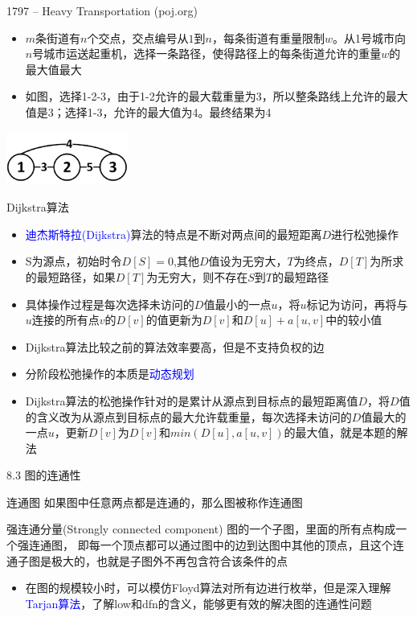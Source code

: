 \begin{frame}{1797 -- Heavy Transportation (poj.org)}
    \begin{itemize}
        \item $m$条街道有$n$个交点，交点编号从$1$到$n$，每条街道有重量限制$w$。从1号城市向$n$号城市运送起重机，选择一条路径，使得路径上的每条街道允许的重量$w$的最大值最大
        \item 如图，选择1-2-3，由于1-2允许的最大载重量为3，所以整条路线上允许的最大值是3；选择1-3，允许的最大值为4。最终结果为4
    \end{itemize}
    \includegraphics[width=0.3\textwidth,center]{fig/8-5.png}
\end{frame}
\begin{frame}{Dijkstra算法}
    \begin{itemize}
        \item \textcolor{blue}{迪杰斯特拉(Dijkstra)}算法的特点是不断对两点间的最短距离$D$进行松弛操作
        \item S为源点，初始时令$D[S]=0$,其他$D$值设为无穷大，$T$为终点，$D[T]$为所求的最短路径，如果$D[T]$为无穷大，则不存在$S$到$T$的最短路径
        \item 具体操作过程是每次选择未访问的$D$值最小的一点$u$，将$u$标记为访问，再将与$u$连接的所有点$v$的$D[v]$的值更新为$D[v]$和$D[u]+a[u,v]$中的较小值
        \item Dijkstra算法比较之前的算法效率要高，但是不支持负权的边
        \item 分阶段松弛操作的本质是\textcolor{blue}{动态规划}
        \item Dijkstra算法的松弛操作针对的是累计从源点到目标点的最短距离值$D$，将$D$值的含义改为从源点到目标点的最大允许载重量，每次选择未访问的$D$值最大的一点$u$，更新$D[v]$为$D[v]$和$min(D[u],a[u,v])$的最大值，就是本题的解法
    \end{itemize}
\end{frame}
\begin{frame}{8.3 图的连通性}
    \begin{block}{连通图}
        如果图中任意两点都是连通的，那么图被称作连通图
    \end{block}
    \vfill
    \begin{block}{强连通分量(Strongly connected component)}
        图的一个子图，里面的所有点构成一个强连通图， 即每一个顶点都可以通过图中的边到达图中其他的顶点，且这个连通子图是极大的，也就是子图外不再包含符合该条件的点
    \end{block}
    \vfill
    \begin{itemize}
        \item 在图的规模较小时，可以模仿Floyd算法对所有边进行枚举，但是深入理解\textcolor{blue}{Tarjan算法}，了解low和dfn的含义，能够更有效的解决图的连通性问题
    \end{itemize}
\end{frame}

